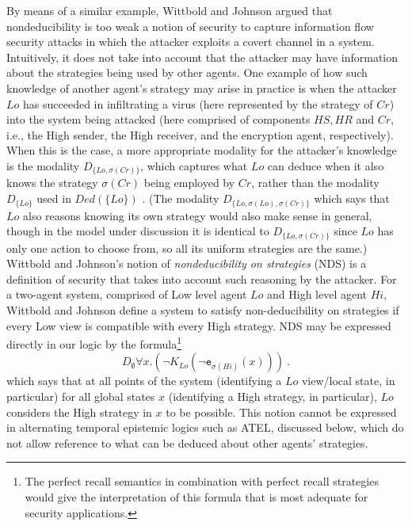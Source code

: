 \documentclass[a4wide]{article}
\theoremstyle{examplesty}
\newcommand{\strat}{\sigma}
\newcommand{\forallg}[1]{\forall #1.}
\newcommand{\lid}[2]{\mathtt{e}_{#1}(#2)}
\newcommand{\Crypt}{Cr}
\newcommand{\Low}{Lo}
\newcommand{\High}{Hi}
\begin{document}
By means of a similar example, Wittbold and Johnson \cite{WJ90} argued that 
nondeducibility is too weak a notion of security to capture information flow security 
attacks in which the attacker exploits a covert channel in a system. Intuitively, 
it does not take into account that the attacker may have information about the 
strategies being used by other agents. One example of how such knowledge of another agent's strategy may arise in practice is
when the attacker $\Low$ has succeeded in infiltrating a virus (here represented by the strategy of $\Crypt$) into the system being
attacked (here comprised of components  $HS,HR$ and $\Crypt$,  i.e., the High sender, the High receiver, and the encryption agent, respectively).
When this is the case, a more appropriate modality for the attacker's knowledge is the modality $D_{\{\Low,  \strat(\Crypt)\}}$, 
which captures what $\Low$ can deduce when it also knows the strategy $\strat(\Crypt)$ being employed by $\Crypt$, 
rather than  the modality $D_{\{\Low\}}$ used in $\mathit{Ded}(\{\Low\})$ . 
(The modality $D_{\{\Low,   \strat(\Low), \strat(\Crypt)\}}$ which says that $\Low$ also reasons knowing its 
own strategy would also make sense in general, though in the model under discussion 
it is identical to $D_{\{\Low,  \strat(\Crypt)\}}$ since $\Low$ has only one action to choose from, so all its uniform strategies are the same.)  
Wittbold and Johnson's notion of \emph{nondeducibility on strategies} (NDS) is a definition of security that 
takes into account such reasoning by the attacker. 
For a two-agent system, comprised of Low level agent $\Low$ and High level agent $\High$, 
Wittbold and Johnson define a system to satisfy non-deducibility on strategies if 
every Low view is compatible with every High strategy. 
NDS may be expressed directly in our logic  by the formula\footnote{The perfect recall semantics in combination with 
perfect recall strategies would give the interpretation of this formula that is most adequate for 
security applications.}  
$$ D_\emptyset \forallg{x}(\neg K_{\Low}(\neg \lid{\strat(\High)}{x}))~.$$ 
which says that at all points of the system (identifying a $\Low$ view/local state, in particular) 
for all global states $x$  (identifying a High strategy, in particular), $\Low$ considers the High strategy in $x$ to be 
possible. 
This notion cannot be expressed in alternating temporal epistemic logics such as ATEL, 
discussed below, which do not allow reference to what can be deduced 
about other agents' strategies.
\end{document}
